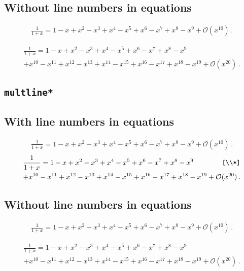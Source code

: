 \documentclass{ltxdoc}
\begin{document}
\subsection*{Without line numbers in equations}
\nextlipsum
\begin{linenomath*}
\begin{multline}
  \frac{1}{1 + x} = 1 - x + x^{2} - x^{3} + x^{4} - x^{5} + x^{6} - x^{7} + x^{8} - x^{9} + \mathcal{O}(x^{10}) \,.
\end{multline}
\end{linenomath*}
\nextlipsum
\begin{linenomath*}
\begin{multline}
  \frac{1}{1 + x} = 1 - x + x^{2} - x^{3} + x^{4} - x^{5} + x^{6} - x^{7} + x^{8} - x^{9} \\
  + x^{10} - x^{11} + x^{12} - x^{13} + x^{14} - x^{15} + x^{16} - x^{17} + x^{18} - x^{19} + \mathcal{O}(x^{20}) \,.
\end{multline}
\end{linenomath*}
\nextlipsum

\subsection*{\texttt{multline*}}

\subsection*{With line numbers in equations}
\nextlipsum
\begin{multline*}
  \frac{1}{1 + x} = 1 - x + x^{2} - x^{3} + x^{4} - x^{5} + x^{6} - x^{7} + x^{8} - x^{9} + \mathcal{O}(x^{10}) \,.
\end{multline*}
\nextlipsum
\begin{multline*}
  \frac{1}{1 + x} = 1 - x + x^{2} - x^{3} + x^{4} - x^{5} + x^{6} - x^{7} + x^{8} - x^{9} \qquad\qquad\texttt{[\textbackslash\textbackslash{}*]}\\*
  + x^{10} - x^{11} + x^{12} - x^{13} + x^{14} - x^{15} + x^{16} - x^{17} + x^{18} - x^{19} + \mathcal{O}(x^{20}) \,.
\end{multline*}
\nextlipsum

\subsection*{Without line numbers in equations}
\nextlipsum
\begin{linenomath*}
\begin{multline*}
  \frac{1}{1 + x} = 1 - x + x^{2} - x^{3} + x^{4} - x^{5} + x^{6} - x^{7} + x^{8} - x^{9} + \mathcal{O}(x^{10}) \,.
\end{multline*}
\end{linenomath*}
\nextlipsum
\begin{linenomath*}
\begin{multline*}
  \frac{1}{1 + x} = 1 - x + x^{2} - x^{3} + x^{4} - x^{5} + x^{6} - x^{7} + x^{8} - x^{9} \\
  + x^{10} - x^{11} + x^{12} - x^{13} + x^{14} - x^{15} + x^{16} - x^{17} + x^{18} - x^{19} + \mathcal{O}(x^{20}) \,.
\end{multline*}
\end{linenomath*}
\nextlipsum
\end{document}
